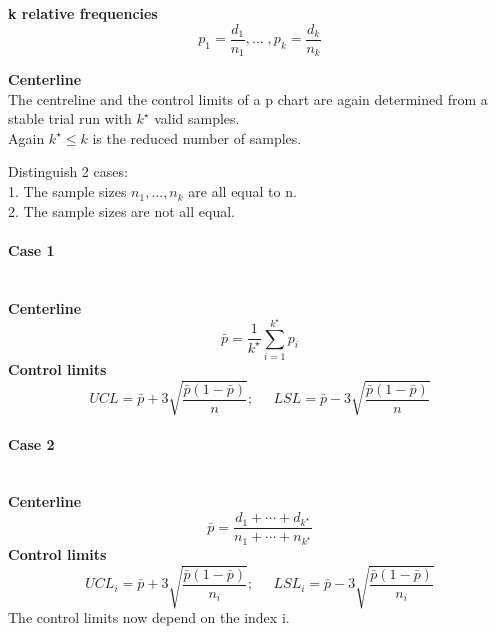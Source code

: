 \textbf{k relative frequencies}
\begin{equation}
  p_1 = \frac{d_1}{n_1},...\;,p_k = \frac{d_k}{n_k}
\end{equation}

\textbf{Centerline}\\
The centreline and the control limits of a p chart are again
determined from a stable trial run with $k^\star$ valid samples.\\
Again $k^\star \leq k$ is the reduced number of samples.

Distinguish 2 cases:\\
1. The sample sizes $n_1,...,n_k$ are all equal to n.\\
2. The sample sizes are not all equal.

\paragraph{Case 1}\mbox{}\\
\textbf{Centerline}
\begin{equation}
  \bar{p} = \frac{1}{k^\star} \sum^{k^\star}_{i=1}p_i
\end{equation}
\textbf{Control limits}
\begin{equation}
  UCL = \bar{p} + 3\sqrt{\frac{\bar{p}(1-\bar{p})}{n}}; \;\;\;\;\; LSL = \bar{p} - 3\sqrt{\frac{\bar{p}(1-\bar{p})}{n}}
\end{equation}

\paragraph{Case 2}\mbox{}\\
\textbf{Centerline}
\begin{equation}
  \bar{p} = \frac{d_1 + \cdots + d_{k^\star}}{n_1 + \cdots + n_{k^\star}}
\end{equation}
\textbf{Control limits}
\begin{equation}
  UCL_i = \bar{p} + 3\sqrt{\frac{\bar{p}(1-\bar{p})}{n_i}}; \;\;\;\;\; LSL_i = \bar{p} - 3\sqrt{\frac{\bar{p}(1-\bar{p})}{n_i}}
\end{equation}
The control limits now depend on the index i.
